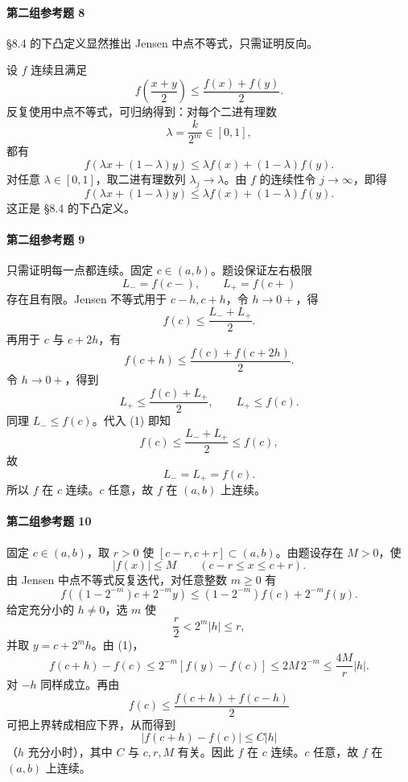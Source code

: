 \paragraph{第二组参考题 8}
\begin{xsolution}
§8.4 的下凸定义显然推出 Jensen 中点不等式，只需证明反向。

设 $f$ 连续且满足
\[
  f\left(\frac{x+y}{2}\right)\le\frac{f(x)+f(y)}2.
\]
反复使用中点不等式，可归纳得到：对每个二进有理数
\[
  \lambda=\frac{k}{2^m}\in[0,1],
\]
都有
\[
  f(\lambda x+(1-\lambda)y)
  \le\lambda f(x)+(1-\lambda)f(y).
\]
对任意 $\lambda\in[0,1]$，取二进有理数列 $\lambda_j\to\lambda$。由 $f$ 的连续性令 $j\to\infty$，即得
\[
  f(\lambda x+(1-\lambda)y)
  \le\lambda f(x)+(1-\lambda)f(y).
\]
这正是 §8.4 的下凸定义。
\end{xsolution}

\paragraph{第二组参考题 9}
\begin{xsolution}
只需证明每一点都连续。固定 $c\in(a,b)$。题设保证左右极限
\[
  L_-=f(c-),\qquad L_+=f(c+)
\]
存在且有限。Jensen 不等式用于 $c-h,c+h$，令 $h\to0+$，得
\[
  f(c)\le\frac{L_-+L_+}{2}.
\tag{1}
\]
再用于 $c$ 与 $c+2h$，有
\[
  f(c+h)\le\frac{f(c)+f(c+2h)}2.
\]
令 $h\to0+$，得到
\[
  L_+\le\frac{f(c)+L_+}{2},
  \qquad L_+\le f(c).
\]
同理 $L_-\le f(c)$。代入 (1) 即知
\[
  f(c)\le\frac{L_-+L_+}{2}\le f(c),
\]
故
\[
  L_-=L_+=f(c).
\]
所以 $f$ 在 $c$ 连续。$c$ 任意，故 $f$ 在 $(a,b)$ 上连续。
\end{xsolution}

\paragraph{第二组参考题 10}
\begin{xsolution}
固定 $c\in(a,b)$，取 $r>0$ 使 $[c-r,c+r]\subset(a,b)$。由题设存在 $M>0$，使
\[
  |f(x)|\le M\qquad(c-r\le x\le c+r).
\]
由 Jensen 中点不等式反复迭代，对任意整数 $m\ge0$ 有
\[
  f\left((1-2^{-m})c+2^{-m}y\right)
  \le(1-2^{-m})f(c)+2^{-m}f(y).
\tag{1}
\]
给定充分小的 $h\ne0$，选 $m$ 使
\[
  \frac r2<2^m|h|\le r,
\]
并取 $y=c+2^m h$。由 (1)，
\[
  f(c+h)-f(c)
  \le2^{-m}[f(y)-f(c)]
  \le2M\,2^{-m}
  \le\frac{4M}{r}|h|.
\]
对 $-h$ 同样成立。再由
\[
  f(c)\le\frac{f(c+h)+f(c-h)}2
\]
可把上界转成相应下界，从而得到
\[
  |f(c+h)-f(c)|\le C|h|
\]
（$h$ 充分小时），其中 $C$ 与 $c,r,M$ 有关。因此 $f$ 在 $c$ 连续。$c$ 任意，故 $f$ 在 $(a,b)$ 上连续。
\end{xsolution}

